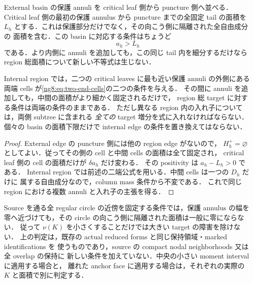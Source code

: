 \begin{corollary}
\label{ng8:ordered-source-area-cuts}
External basin の保護 annuli を critical leaf 側から puncture 側へ並べる．
Critical leaf 側の最初の保護 annulus から puncture までの全固定 tail の面積を
$L_h$ とする．これは保護部分だけでなく，その向こう側に隔離された全自由成分の
面積を含む．この basin に対応する条件はちょうど
\[
 a_h>L_h
\]
である．より内側に annuli を追加しても，この同じ tail 内を細分するだけなら
region 総面積について新しい不等式は生じない．

Internal region では，二つの critical leaves に最も近い保護 annuli の外側にある
両端 cells が\eqref{ng8:eq:two-end-cells}の二つの条件を与える．
その間に annuli を追加しても，中間の面積がより細かく固定されるだけで，
region 総 target に対する条件は両端の条件のままである．
ただし異なる region 内の入れ子については，両側 subtree に含まれる
\emph{全ての} target 増分を式に入れなければならない．
個々の basin の面積下限だけで internal edge の条件を置き換えてはならない．
\end{corollary}

\begin{proof}
External edge の puncture 側には他の region edge がないので，
$H_h^+=\varnothing$ としてよい．従ってその側の cell と中間 cells の面積は全て固定され，
critical leaf 側の cell の面積だけが $\delta a_h$ だけ変わる．
その positivity は $a_h-L_h>0$ である．
Internal region では前述の二端公式を用いる．中間 cells は一つの $D_h$ だけに
属する自由成分なので，column mass 条件から不変である．
これで同じ region における複数 annuli と入れ子の主張を得る．
\end{proof}

\begin{remark}[幅を縮めても消えない面積予算]
Source を通る全 regular circle の近傍を固定する条件では，保護 annulus の幅を
零へ近づけても，その circle の向こう側に隔離された面積は一般に零にならない．
従って $\nu(K)$ を小さくすることだけでは大きい target の障害を除けない．
上の判定は，既存の actual reduced forms と同じ保持領域・marked identifications を
使うものであり，source の compact nodal neighborhoods 又は全 overlap の保持に
新しい条件を加えていない．中央の小さい moment interval に適用する場合と，
離れた anchor face に適用する場合は，それぞれの実際の $K$ と面積で別に判定する．
\end{remark}

